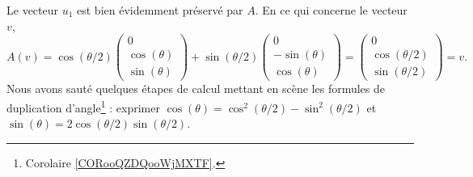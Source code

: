 \begin{subproof}
	Le vecteur \( u_1\) est bien évidemment préservé par \( A\). En ce qui concerne le vecteur \( v\),
	\begin{equation}
		A(v)=\cos(\theta/2)\begin{pmatrix}
			0            \\
			\cos(\theta) \\
			\sin(\theta)
		\end{pmatrix}+\sin(\theta/2)\begin{pmatrix}
			0             \\
			-\sin(\theta) \\
			\cos(\theta)
		\end{pmatrix}=
		\begin{pmatrix}
			0              \\
			\cos(\theta/2) \\
			\sin(\theta/2)
		\end{pmatrix}=v.
	\end{equation}
	Nous avons sauté quelques étapes de calcul mettant en scène les formules de duplication d'angle\footnote{Corolaire \ref{CORooQZDQooWjMXTF}.} : exprimer \( \cos(\theta)=\cos^2(\theta/2)-\sin^2(\theta/2)\) et \( \sin(\theta)=2\cos(\theta/2)\sin(\theta/2)\).


\end{subproof}
